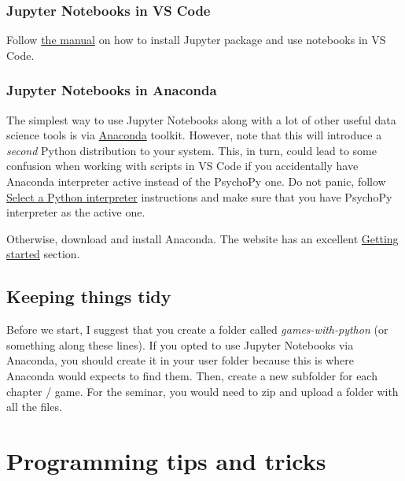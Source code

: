 \documentclass[
]{book}
\begin{document}
\hypertarget{jupyter-notebooks-in-vs-code}{%
\subsection{Jupyter Notebooks in VS Code}\label{jupyter-notebooks-in-vs-code}}

Follow \href{https://code.visualstudio.com/docs/datascience/jupyter-notebooks}{the manual} on how to install Jupyter package and use notebooks in VS Code.

\hypertarget{jupyter-notebooks-in-anaconda}{%
\subsection{Jupyter Notebooks in Anaconda}\label{jupyter-notebooks-in-anaconda}}

The simplest way to use Jupyter Notebooks along with a lot of other useful data science tools is via \href{https://www.anaconda.com/products/individual}{Anaconda} toolkit. However, note that this will introduce a \emph{second} Python distribution to your system. This, in turn, could lead to some confusion when working with scripts in VS Code if you accidentally have Anaconda interpreter active instead of the PsychoPy one. Do not panic, follow \href{https://code.visualstudio.com/docs/python/python-tutorial\#_select-a-python-interpreter}{Select a Python interpreter} instructions and make sure that you have PsychoPy interpreter as the active one.

Otherwise, download and install Anaconda. The website has an excellent \href{https://docs.anaconda.com/anaconda/user-guide/getting-started/}{Getting started} section.

\hypertarget{files-folder}{%
\section{Keeping things tidy}\label{files-folder}}

Before we start, I suggest that you create a folder called \emph{games-with-python} (or something along these lines). If you opted to use Jupyter Notebooks via Anaconda, you should create it in your user folder because this is where Anaconda would expects to find them. Then, create a new subfolder for each chapter / game. For the seminar, you would need to zip and upload a folder with all the files.

\hypertarget{programming-tips}{%
\chapter{Programming tips and tricks}\label{programming-tips}}
\end{document}
